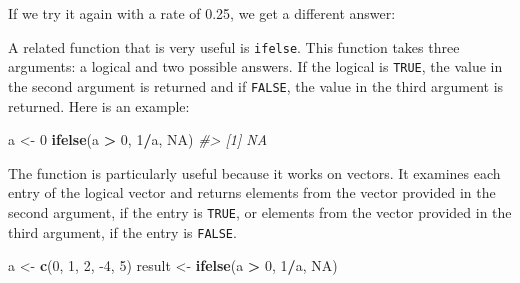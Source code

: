 \documentclass[
]{krantz}
\newenvironment{Shaded}{\begin{snugshade}}{\end{snugshade}}
\newcommand{\CommentTok}[1]{\textcolor[rgb]{0.37,0.37,0.37}{\textit{#1}}}
\newcommand{\ControlFlowTok}[1]{\textcolor[rgb]{0.27,0.27,0.27}{\textbf{#1}}}
\newcommand{\DecValTok}[1]{\textcolor[rgb]{0.06,0.06,0.06}{#1}}
\newcommand{\FloatTok}[1]{\textcolor[rgb]{0.06,0.06,0.06}{#1}}
\newcommand{\KeywordTok}[1]{\textcolor[rgb]{0.27,0.27,0.27}{\textbf{#1}}}
\newcommand{\NormalTok}[1]{#1}
\newcommand{\OperatorTok}[1]{\textcolor[rgb]{0.43,0.43,0.43}{\textbf{#1}}}
\newcommand{\OtherTok}[1]{\textcolor[rgb]{0.37,0.37,0.37}{#1}}
\newcommand{\StringTok}[1]{\textcolor[rgb]{0.5,0.5,0.5}{#1}}
\begin{document}
If we try it again with a rate of 0.25, we get a different answer:

\begin{Shaded}
\end{Shaded}

A related function that is very useful is \texttt{ifelse}. This function takes three arguments: a logical and two possible answers. If the logical is \texttt{TRUE}, the value in the second argument is returned and if \texttt{FALSE}, the value in the third argument is returned. Here is an example:

\begin{Shaded}
\begin{Highlighting}[]
\NormalTok{a <-}\StringTok{ }\DecValTok{0}
\KeywordTok{ifelse}\NormalTok{(a }\OperatorTok{>}\StringTok{ }\DecValTok{0}\NormalTok{, }\DecValTok{1}\OperatorTok{/}\NormalTok{a, }\OtherTok{NA}\NormalTok{)}
\CommentTok{#> [1] NA}
\end{Highlighting}
\end{Shaded}

The function is particularly useful because it works on vectors. It examines each entry of the logical vector and returns elements from the vector provided in the second argument, if the entry is \texttt{TRUE}, or elements from the vector provided in the third argument, if the entry is \texttt{FALSE}.

\begin{Shaded}
\begin{Highlighting}[]
\NormalTok{a <-}\StringTok{ }\KeywordTok{c}\NormalTok{(}\DecValTok{0}\NormalTok{, }\DecValTok{1}\NormalTok{, }\DecValTok{2}\NormalTok{, }\DecValTok{-4}\NormalTok{, }\DecValTok{5}\NormalTok{)}
\NormalTok{result <-}\StringTok{ }\KeywordTok{ifelse}\NormalTok{(a }\OperatorTok{>}\StringTok{ }\DecValTok{0}\NormalTok{, }\DecValTok{1}\OperatorTok{/}\NormalTok{a, }\OtherTok{NA}\NormalTok{)}
\end{Highlighting}
\end{Shaded}
\end{document}
